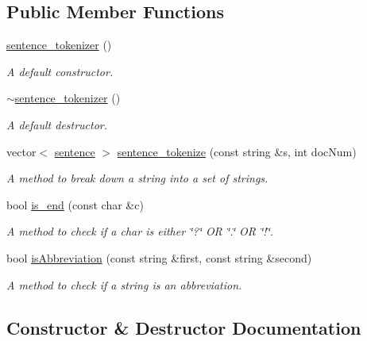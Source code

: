 \subsection*{Public Member Functions}
\begin{DoxyCompactItemize}
\item 
\hyperlink{classsentence__tokenizer_aa36679bc4afb2788d5c81fcee4ab9e0b}{sentence\+\_\+tokenizer} ()
\begin{DoxyCompactList}\small\item\em A default constructor. \end{DoxyCompactList}\item 
\mbox{\label{classsentence__tokenizer_ac15a8df6ebb233288866e8d692e514c8}} 
\hyperlink{classsentence__tokenizer_ac15a8df6ebb233288866e8d692e514c8}{$\sim$sentence\+\_\+tokenizer} ()
\begin{DoxyCompactList}\small\item\em A default destructor. \end{DoxyCompactList}\item 
vector$<$ \hyperlink{classsentence}{sentence} $>$ \hyperlink{classsentence__tokenizer_ab394b821c6d32d41ae07ae84a0d1b5a6}{sentence\+\_\+tokenize} (const string \&s, int doc\+Num)
\begin{DoxyCompactList}\small\item\em A method to break down a string into a set of strings. \end{DoxyCompactList}\item 
bool \hyperlink{classsentence__tokenizer_accdc817790cdb696912ec8076701f8a9}{is\+\_\+end} (const char \&c)
\begin{DoxyCompactList}\small\item\em A method to check if a char is either \char`\"{}?\char`\"{} OR \char`\"{}.\char`\"{} OR \char`\"{}!\char`\"{}. \end{DoxyCompactList}\item 
bool \hyperlink{classsentence__tokenizer_a2f86e3437eb3a948b5ee309ce04d0029}{is\+Abbreviation} (const string \&first, const string \&second)
\begin{DoxyCompactList}\small\item\em A method to check if a string is an abbreviation. \end{DoxyCompactList}\end{DoxyCompactItemize}


\subsection{Constructor \& Destructor Documentation}
\mbox{\label{classsentence__tokenizer_aa36679bc4afb2788d5c81fcee4ab9e0b}} 
